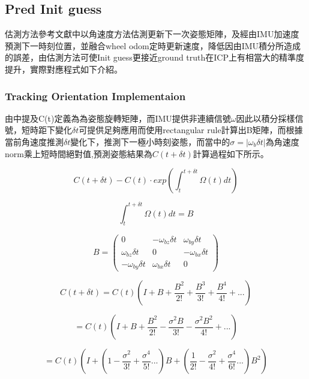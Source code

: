 \documentclass{article}
\begin{document}
\subsection{Pred Init guess}
估測方法參考文獻\cite{1}中以角速度方法估測更新下一次姿態矩陣，及經由IMU加速度預測下一時刻位置，並融合wheel odom定時更新速度，降低因由IMU積分所造成的誤差，由估測方法可使Init guess更接近ground truth在ICP上有相當大的精準度提升，實際對應程式如下介紹。
\subsubsection{Tracking Orientation Implementaion}
由\cite{1}中提及C(t)定義為為姿態旋轉矩陣，而IMU提供非連續信號$\omega$因此以積分採樣信號，短時距下變化$\delta{t}$可提供足夠應用而\cite{1}使用rectangular rule計算出B矩陣，而根據當前角速度推測$\delta{t}$變化下，推測下一極小時刻姿態，而當中的$\sigma=|\omega_b \delta{t}|$為角速度norm乘上短時間絕對值,預測姿態結果為$C(t+\delta{t})$計算過程如下所示。

\begin{equation}
	C(t+\delta{t}) - C(t)\cdot exp(\int_{t}^{t+\delta t} \Omega(t)dt)
\end{equation}

\begin{equation}
	\int_{t}^{t+\delta{t}}\Omega(t)dt=B
\end{equation}

\begin{equation}
	B = \begin{pmatrix} 0 & -\omega_{bz}\delta{t} & \omega_{by}\delta{t}\\
						\omega_{bz}\delta{t} & 0 & -\omega_{bx}\delta{t}\\
						-\omega_{by}\delta{t} & \omega_{bx}\delta{t} & 0
		\end{pmatrix}
\end{equation}

\begin{equation}
	C(t+\delta{t})=C(t)\left(I+B+\frac{B^2}{2!} + \frac{B^3}{3!} + \frac{B^4}{4!} + ... \right)
\end{equation}

\begin{equation}
 	= C(t)\left(I + B + \frac{B^2}{2!} - \frac{\sigma^2B}{3!} - \frac{\sigma^2B^2}{4!} + ... \right)
\end{equation}

\begin{equation}
	= C(t)\left(I + \left( 1 - \frac{\sigma^2}{3!} + \frac{\sigma^4}{5!}... \right)B + \left(\frac{1}{2!} - \frac{\sigma^2}{4!} + \frac{\sigma^4}{6!}...\right)B^2 \right)
\end{equation}
\end{document}
